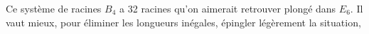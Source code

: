 Ce système de racines $B_4$ a 32 racines  qu'on aimerait retrouver plongé dans $E_6$. Il vaut mieux, pour éliminer les longueurs inégales, épingler légèrement la situation,
